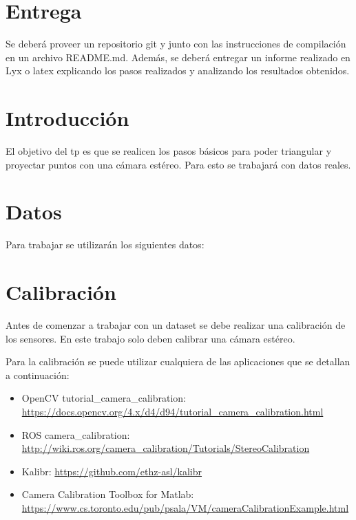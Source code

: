 \documentclass[tp]{lcc}
\begin{document}
\maketitle

\section{Entrega}
Se deberá proveer un repositorio git y junto con las instrucciones de compilación en un archivo README.md.
Además, se deberá entregar un informe realizado en Lyx o latex explicando los pasos realizados y analizando los resultados obtenidos.

\section{Introducción}

El objetivo del tp es que se realicen los pasos básicos para poder triangular y proyectar puntos con una cámara estéreo. 
Para esto se trabajará con datos reales.

\section{Datos}
Para trabajar se utilizarán los siguientes datos:

\section{Calibración}
Antes de comenzar a trabajar con un dataset se debe realizar una calibración de los sensores. En este trabajo solo deben calibrar una cámara estéreo.

Para la calibración se puede utilizar cualquiera de las aplicaciones que se detallan a continuación:
\begin{itemize}
	\item OpenCV tutorial\_camera\_calibration: \href{https://docs.opencv.org/4.x/d4/d94/tutorial_camera_calibration.html}{https://docs.opencv.org/4.x/d4/d94/tutorial\_camera\_calibration.html}
	\item ROS camera\_calibration: \href{http://wiki.ros.org/camera_calibration/Tutorials/StereoCalibration}{http://wiki.ros.org/camera\_calibration/Tutorials/StereoCalibration}
	\item Kalibr: \href{https://github.com/ethz-asl/kalibr}{https://github.com/ethz-asl/kalibr}
	\item Camera Calibration Toolbox for Matlab: \href{https://www.cs.toronto.edu/pub/psala/VM/cameraCalibrationExample.html}{https://www.cs.toronto.edu/pub/psala/VM/cameraCalibrationExample.html}
\end{itemize}
\end{document}
